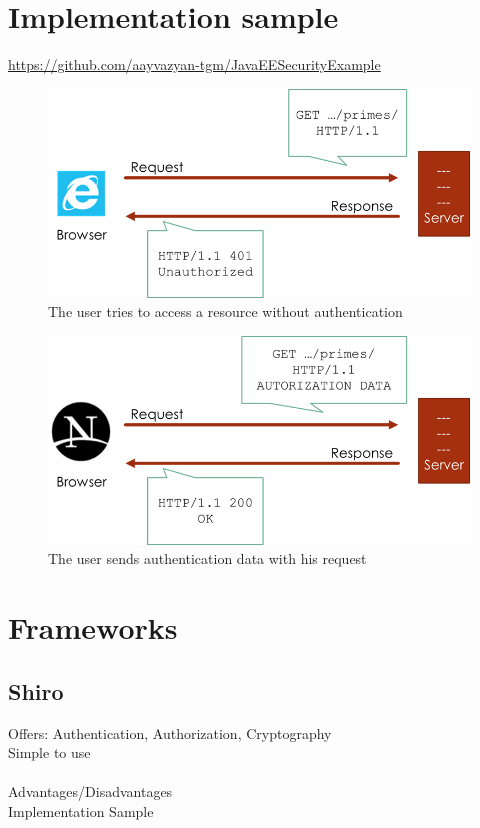 \documentclass[12pt,a4paper]{report}
\begin{document}
\newpage
\section{Implementation sample}
\href{https://github.com/aayvazyan-tgm/JavaEESecurityExample}{https://github.com/aayvazyan-tgm/JavaEESecurityExample}\\
\begin{figure}[h!]
\centering
\includegraphics[width=1\linewidth]{res/Unauthorized}
\caption{The user tries to access a resource without authentication}
\label{fig:Unauthorized}
\end{figure}

\begin{figure}[h!]
	\centering
	\includegraphics[width=1\linewidth]{res/Authorized}
	\caption{The user sends authentication data with his request}
	\label{fig:Authorized}
\end{figure}

\section{Frameworks}
\subsection{Shiro}
Offers: Authentication, Authorization, Cryptography\\
Simple to use\\\\
Advantages/Disadvantages\\
Implementation Sample
\end{document}
